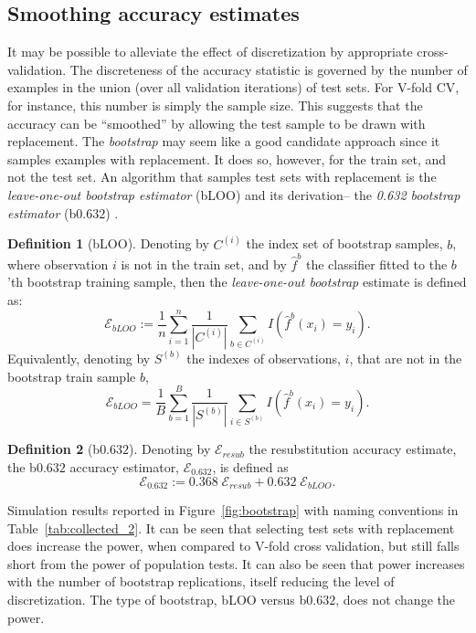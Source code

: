 \documentclass[12pt,a4paper]{article}
\theoremstyle{definition}
\newtheorem{definition}{Definition}
\newcommand{\hyp}{f} %
\newcommand{\hypEstim}{\hat{\hyp}} %
\newcommand{\acc}{\mathcal{E}}
\begin{document}
\subsection{Smoothing accuracy estimates}
\label{sec:bootstrap}
It may be possible to alleviate the effect of discretization by appropriate cross-validation. 
The discreteness of the accuracy statistic is governed by the number of examples in the union (over all validation iterations) of test sets.
For V-fold CV, for instance, this number is simply the sample size. 
This suggests that the accuracy can be ``smoothed'' by allowing the test sample to be drawn with replacement. 
The \emph{bootstrap} may seem like a good candidate approach since it samples examples with replacement. 
It does so, however, for the train set, and not the test set. 
An algorithm that samples test sets with replacement is the \emph{leave-one-out bootstrap estimator} (bLOO) and its derivation-- the \emph{0.632 bootstrap estimator} (b$0.632$) \citep[Sec 7.11]{hastie_elements_2003}.
\begin{definition}[bLOO]
\label{def:bloo}
Denoting by $C^{(i)}$ the index set of bootstrap samples, $b$, where observation $i$ is not in the train set,
and by $\hypEstim^b$ the classifier fitted to the $b$'th bootstrap training sample, 
then the \emph{leave-one-out bootstrap} estimate is defined as:
$$
	\acc_{bLOO}:= \frac 1n \sum_{i=1}^{n} \frac{1}{|C^{(i)}|} \sum_{b \in C^{(i)}} I(\hypEstim^b(x_i)=y_i).
$$ 
Equivalently, denoting by $S^{(b)}$ the indexes of observations, $i$, that are not in the bootstrap train sample $b$,
$$
	\acc_{bLOO}= \frac 1B \sum_{b=1}^{B} \frac{1}{|S^{(b)}|} \sum_{i \in S^{(b)}} I(\hypEstim^b(x_i)=y_i).
$$
\end{definition}

\begin{definition}[b$0.632$]
\label{def:b0632}
Denoting by $\acc_{resub}$ the resubstitution accuracy estimate, 
the b$0.632$ accuracy estimator, $\acc_{0.632}$, is defined as 
$$
	\acc_{0.632} := 0.368 \; \acc_{resub}  + 0.632 \; \acc_{bLOO}.
$$
\end{definition}

Simulation results reported in Figure~\ref{fig:bootstrap} with naming conventions in Table~\ref{tab:collected_2}.
It can be seen that selecting test sets with replacement does increase the power, when compared to V-fold cross validation, but still falls short from the power of population tests. 
It can also be seen that power increases with the number of bootstrap replications, itself reducing the level of discretization. 
The type of bootstrap, bLOO versus b$0.632$, does not change the power. 
\end{document}
